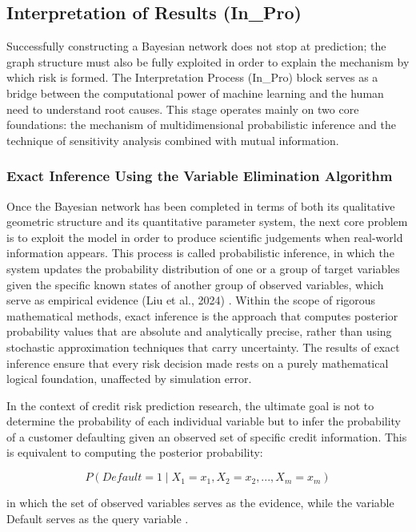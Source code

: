 \subsection{Interpretation of Results (In\_Pro)}
\noindent
Successfully constructing a Bayesian network does not stop at prediction; the graph structure must also be fully exploited in order to explain the mechanism by which risk is formed. The Interpretation Process (In\_Pro) block serves as a bridge between the computational power of machine learning and the human need to understand root causes. This stage operates mainly on two core foundations: the mechanism of multidimensional probabilistic inference and the technique of sensitivity analysis combined with mutual information.

\subsubsection{Exact Inference Using the Variable Elimination Algorithm}
\noindent
Once the Bayesian network has been completed in terms of both its qualitative geometric structure and its quantitative parameter system, the next core problem is to exploit the model in order to produce scientific judgements when real-world information appears. This process is called probabilistic inference, in which the system updates the probability distribution of one or a group of target variables given the specific known states of another group of observed variables, which serve as empirical evidence (Liu et al., 2024) \cite{liu2024credit}. Within the scope of rigorous mathematical methods, exact inference is the approach that computes posterior probability values that are absolute and analytically precise, rather than using stochastic approximation techniques that carry uncertainty. The results of exact inference ensure that every risk decision made rests on a purely mathematical logical foundation, unaffected by simulation error.

In the context of credit risk prediction research, the ultimate goal is not to determine the probability of each individual variable but to infer the probability of a customer defaulting given an observed set of specific credit information. This is equivalent to computing the posterior probability:

\begin{equation}
    P(Default=1 \mid X_1=x_1, X_2=x_2, ..., X_m=x_m)
\end{equation}

\noindent
in which the set of observed variables serves as the evidence, while the variable Default serves as the query variable \cite{liu2024credit}.

